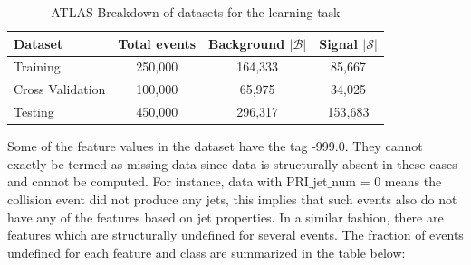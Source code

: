 \begin{table}[H]
\begin{center}
\begin{tabular}{l|c|c|c}
Dataset & Total events & Background $|\mathcal{B}|$ &  Signal $|\mathcal{S}|$ \\
\toprule
Training & 250,000 & 164,333 & 85,667 \\
Cross Validation & 100,000 & 65,975 & 34,025\\
Testing & 450,000 & 296,317 & 153,683\\

\end{tabular}
\caption{ATLAS Breakdown of datasets for the learning task}
\label{break}
\end{center}
\end{table}
Some of the feature values in the dataset have the tag -999.0. They cannot exactly be termed as missing data since data is structurally absent in these cases and cannot be computed. For instance, data with PRI$\_$jet$\_$num = 0 means the collision event did not produce any jets, this implies that such events also do not have any of the features based on jet properties. In a similar fashion, there are features which are structurally undefined for several events. The fraction of events undefined for each feature and class are summarized in the table below: 
 
